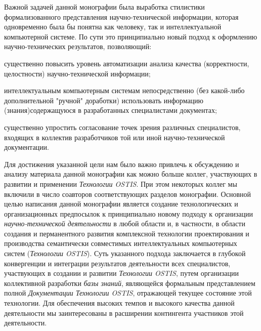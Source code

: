 \begin{SCn}
{Важной задачей данной  монографии   была выработка стилистики формализованного представления научно-технической информации, которая одновременно была бы понятна как человеку, так и интеллектуальной компьютерной системе. По сути это принципиально новый подход к оформлению научно-технических результатов, позволяющий:
\begin{scnitemize}
 \item существенно повысить уровень автоматизации анализа качества (корректности, целостности) научно-технической информации;
 \item интеллектуальным компьютерным системам непосредственно (без какой-либо дополнительной "ручной" доработки) использовать информацию (знания)содержащуюся в разработанных специалистами документах;
 \item существенно упростить согласование точек зрения различных специалистов, входящих в коллектив разработчиков той или  иной научно-технической документации.
\end{scnitemize}
Для достижения указанной цели нам было важно привлечь к обсуждению и анализу материала данной монографии как можно больше коллег, участвующих в развитии и применении \textit{Технологии OSTIS}. При этом некоторых коллег мы включили в число соавторов соответствующих разделов монографии.
Основной целью написания данной монографии является создание технологических и организационных предпосылок к принципиально новому  подходу к организации \textit{научно-технической деятельности} в любой области и, в частности, в области создания и перманентного развития комплексной технологии проектирования и производства семантически совместимых интеллектуальных компьютерных систем (\textit{Технологии OSTIS}). Суть указанного подхода заключается  в глубокой конвергенции и интеграции результатов деятельности всех специалистов, участвующих в создании и развитии \textit{Технологии OSTIS}, путем организации коллективной разработки \textit{базы знаний}, являющейся формальным представлением полной \textit{Документации Технологии OSTIS}, отражающей текущее состояние этой технологии. Для обеспечения высоких темпов и высокого качества данной деятельности мы заинтересованы в расширении контингента участников этой деятельности.

}
\end{SCn}

